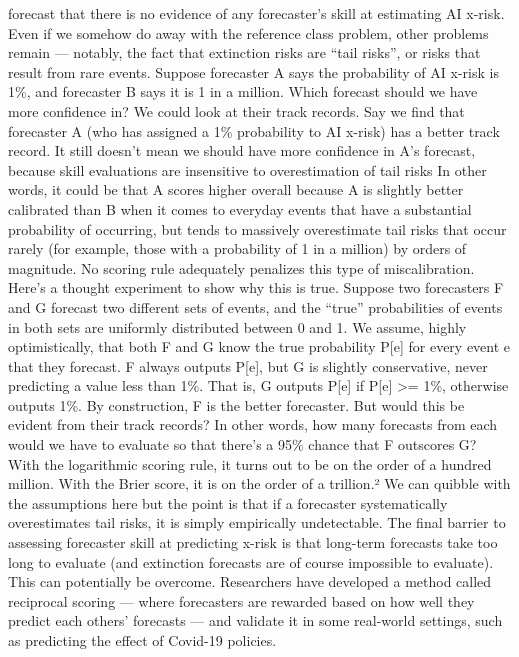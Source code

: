 forecast that there is no evidence of any forecaster’s skill at
estimating AI x-risk.
Even if we somehow do away with the reference class problem,
other problems remain — notably, the fact that extinction risks are
“tail risks”, or risks that result from rare events. Suppose forecaster A
says the probability of AI x-risk is 1\%, and forecaster B says it is 1 in
a million. Which forecast should we have more conﬁdence in? We
could look at their track records. Say we ﬁnd that forecaster A (who
has assigned a 1\% probability to AI x-risk) has a better track record.
It still doesn’t mean we should have more conﬁdence in A’s forecast,
because skill evaluations are insensitive to overestimation of tail risks
In other words, it could be that A scores higher overall because A is
slightly better calibrated than B when it comes to everyday events
that have a substantial probability of occurring, but tends to
massively overestimate tail risks that occur rarely (for example, those
with a probability of 1 in a million) by orders of magnitude. No scoring
rule adequately penalizes this type of miscalibration.
Here’s a thought experiment to show why this is true. Suppose two
forecasters F and G forecast two different sets of events, and the
“true” probabilities of events in both sets are uniformly distributed
between 0 and 1. We assume, highly optimistically, that both F and G
know the true probability P[e] for every event e that they forecast. F
always outputs P[e], but G is slightly conservative, never predicting a
value less than 1\%. That is, G outputs P[e] if P[e] >= 1\%, otherwise
outputs 1\%.
By construction, F is the better forecaster. But would this be evident
from their track records? In other words, how many forecasts from
each would we have to evaluate so that there’s a 95\% chance that F
outscores G? With the logarithmic scoring rule, it turns out to be on
the order of a hundred million. With the Brier score, it is on the order
of a trillion.² We can quibble with the assumptions here but the point
is that if a forecaster systematically overestimates tail risks, it is
simply empirically undetectable.
The ﬁnal barrier to assessing forecaster skill at predicting x-risk is
that long-term forecasts take too long to evaluate (and extinction
forecasts are of course impossible to evaluate). This can potentially
be overcome. Researchers have developed a method called
reciprocal scoring — where forecasters are rewarded based on how
well they predict each others’ forecasts — and validate it in some
real-world settings, such as predicting the effect of Covid-19 policies.
